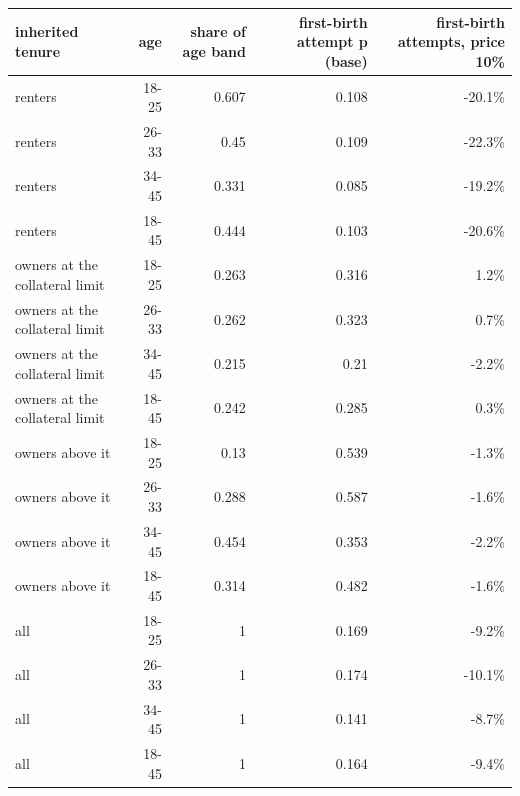 \begin{tabular}{lrrrr}
\toprule
inherited tenure & age & share of age band & first-birth attempt p (base) & first-birth attempts, price 10\% \\
\midrule
renters & 18-25 & 0.607 & 0.108 & -20.1\% \\
renters & 26-33 & 0.45 & 0.109 & -22.3\% \\
renters & 34-45 & 0.331 & 0.085 & -19.2\% \\
renters & 18-45 & 0.444 & 0.103 & -20.6\% \\
owners at the collateral limit & 18-25 & 0.263 & 0.316 & 1.2\% \\
owners at the collateral limit & 26-33 & 0.262 & 0.323 & 0.7\% \\
owners at the collateral limit & 34-45 & 0.215 & 0.21 & -2.2\% \\
owners at the collateral limit & 18-45 & 0.242 & 0.285 & 0.3\% \\
owners above it & 18-25 & 0.13 & 0.539 & -1.3\% \\
owners above it & 26-33 & 0.288 & 0.587 & -1.6\% \\
owners above it & 34-45 & 0.454 & 0.353 & -2.2\% \\
owners above it & 18-45 & 0.314 & 0.482 & -1.6\% \\
all & 18-25 & 1 & 0.169 & -9.2\% \\
all & 26-33 & 1 & 0.174 & -10.1\% \\
all & 34-45 & 1 & 0.141 & -8.7\% \\
all & 18-45 & 1 & 0.164 & -9.4\% \\
\bottomrule
\end{tabular}
